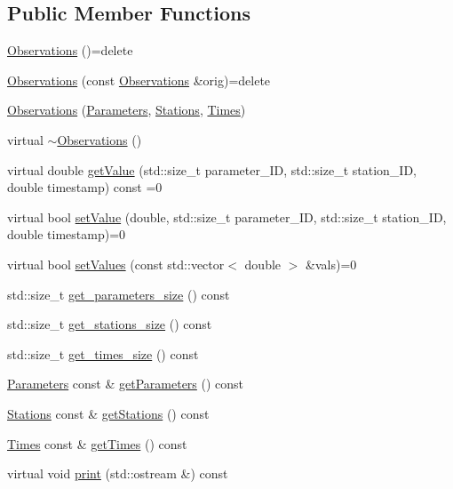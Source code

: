 \subsection*{Public Member Functions}
\begin{DoxyCompactItemize}
\item 
\mbox{\hyperlink{class_observations_ab5a998900064d3d0599e4548a6508d9f}{Observations}} ()=delete
\item 
\mbox{\hyperlink{class_observations_a579feccdac9c26226cf813ac8cf3521a}{Observations}} (const \mbox{\hyperlink{class_observations}{Observations}} \&orig)=delete
\item 
\mbox{\hyperlink{class_observations_a67aabf1b5bb51b8bcb9f6cf3df64f57d}{Observations}} (\mbox{\hyperlink{class_parameters}{Parameters}}, \mbox{\hyperlink{class_stations}{Stations}}, \mbox{\hyperlink{class_times}{Times}})
\item 
virtual \mbox{\hyperlink{class_observations_a8724b267cce796b0f77f8f2b9e4aaf1d}{$\sim$\+Observations}} ()
\item 
virtual double \mbox{\hyperlink{class_observations_ac5564bbf13e79d269407d1ecf567cd7f}{get\+Value}} (std\+::size\+\_\+t parameter\+\_\+\+ID, std\+::size\+\_\+t station\+\_\+\+ID, double timestamp) const =0
\item 
virtual bool \mbox{\hyperlink{class_observations_a359b5b8cd97cd43483444ca4fc188dff}{set\+Value}} (double, std\+::size\+\_\+t parameter\+\_\+\+ID, std\+::size\+\_\+t station\+\_\+\+ID, double timestamp)=0
\item 
virtual bool \mbox{\hyperlink{class_observations_a58e9bcf10981845ad5bf89b34cacdbd7}{set\+Values}} (const std\+::vector$<$ double $>$ \&vals)=0
\item 
std\+::size\+\_\+t \mbox{\hyperlink{class_observations_a4ae6818f6d01490eb14d63ce51a1d331}{get\+\_\+parameters\+\_\+size}} () const
\item 
std\+::size\+\_\+t \mbox{\hyperlink{class_observations_a30f67730e600545cf8cb9d7aed13bd33}{get\+\_\+stations\+\_\+size}} () const
\item 
std\+::size\+\_\+t \mbox{\hyperlink{class_observations_a352e34f7c278c86f54c69def24dabcd1}{get\+\_\+times\+\_\+size}} () const
\item 
\mbox{\hyperlink{class_parameters}{Parameters}} const  \& \mbox{\hyperlink{class_observations_a8401a31f796d79387603baeea5269b6b}{get\+Parameters}} () const
\item 
\mbox{\hyperlink{class_stations}{Stations}} const  \& \mbox{\hyperlink{class_observations_a3c9520bed358d0f2ce0a08b94c84b94c}{get\+Stations}} () const
\item 
\mbox{\hyperlink{class_times}{Times}} const  \& \mbox{\hyperlink{class_observations_a3d364631c280ad9c35238e781f63e75c}{get\+Times}} () const
\item 
virtual void \mbox{\hyperlink{class_observations_a523647c5ae644959f0ed583cd7b11aba}{print}} (std\+::ostream \&) const
\end{DoxyCompactItemize}

